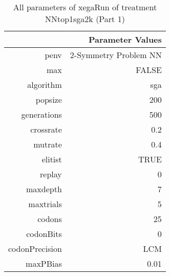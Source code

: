 \begin{table}[ht]
\centering
\begin{tabular}{rr}
  \hline
 & Parameter Values \\ 
  \hline
penv & 2-Symmetry Problem NN \\ 
  max & FALSE \\ 
  algorithm & sga \\ 
  popsize & 200 \\ 
  generations & 500 \\ 
  crossrate & 0.2 \\ 
  mutrate & 0.4 \\ 
  elitist & TRUE \\ 
  replay & 0 \\ 
  maxdepth & 7 \\ 
  maxtrials & 5 \\ 
  codons & 25 \\ 
  codonBits & 0 \\ 
  codonPrecision & LCM \\ 
  maxPBias & 0.01 \\ 
   \hline
\end{tabular}
\caption{ All parameters of xegaRun of treatment NNtop1sga2k 
 (Part 1)} 
\end{table}
